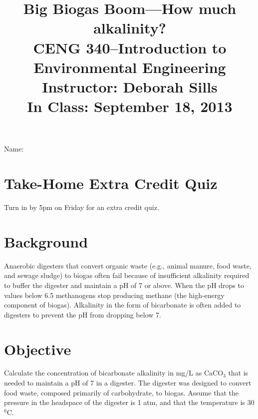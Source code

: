 \documentclass[11pt,letterpaper]{article}
\begin{document}
\setlength{\parindent}{0cm} 



\frenchspacing

\setlength{\textwidth}{6.25in}

\title {\Large{\textbf{Big Biogas Boom---How much alkalinity?}}\\ \large{CENG 340--Introduction to Environmental Engineering\\
Instructor: Deborah Sills\\ \textbf{In Class: September 18, 2013}}}

\author {}
\date {}
\maketitle

\vspace{-1.5cm}

\large{Name:}



\section *{Take-Home Extra Credit Quiz} 
Turn in by 5pm on Friday for an extra credit quiz.

\section *{Background}

Anaerobic digesters that convert organic waste (e.g., animal manure, food waste, and sewage sludge) to biogas often fail because of insufficient alkalinity required to buffer the digester and maintain a pH of 7 or above.  When the pH drops to values below 6.5 methanogens stop  producing methane (the high-energy component of biogas). Alkalinity in the form of bicarbonate is often added to digesters to prevent the pH from dropping below 7.

\section *{Objective}
Calculate the concentration of bicarbonate alkalinity in mg/L as CaCO$_3$ that is needed  to maintain a pH of 7 in a digester.   The digester was designed to convert food waste, composed primarily of carbohydrate, to biogas. Assume that the pressure in the headspace of the digester is  1 atm, and that the temperature is 30 $^0$C. 
\end{document}
